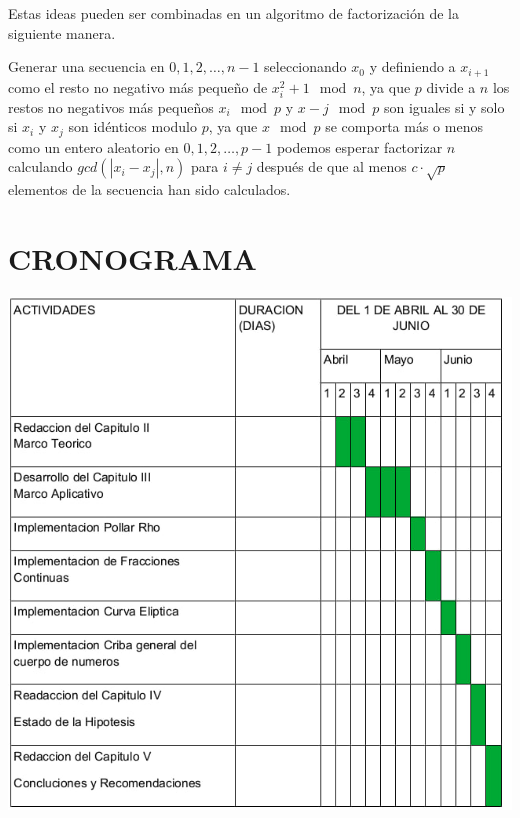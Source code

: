 \documentclass[12pt,letterpaper]{book}
\begin{document}
    Estas ideas pueden ser combinadas en un algoritmo de factorización de la siguiente manera.

    Generar una secuencia en $0, 1, 2, \dots, n-1$ seleccionando $x_{0}$ y definiendo a $x_{i+1}$ como el resto no negativo más pequeño de $x^{2}_{i} + 1 \mod n$, ya que $p$ divide a $n$ los restos no negativos más pequeños $x_{i} \mod p$ y $x-{j} \mod p$ son iguales si y solo si $x_{i}$ y $x_{j}$ son idénticos modulo $p$, ya que $x \mod p$ se comporta más o menos como un entero aleatorio en $0, 1, 2, \dots, p-1$ podemos esperar factorizar $n$ calculando $gcd(|x_{i} - x_{j}|, n)$ para $i \not = j$ después de que al menos $c\cdot\sqrt{p}$ elementos de la secuencia han sido calculados.

    \clearpage
    \chapter{CRONOGRAMA}
    \includegraphics[scale=1]{images/cronograma.jpg}

    \clearpage
\end{document}
